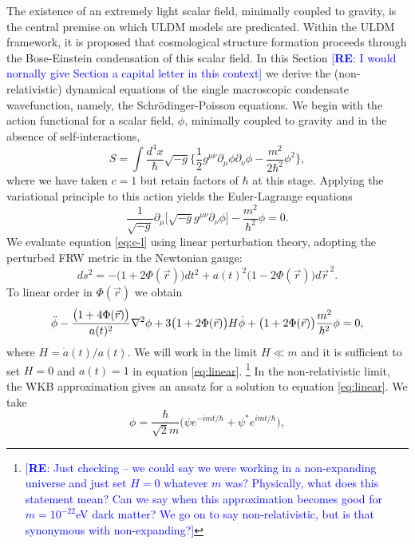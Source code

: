\documentclass[a4paper,11pt]{article}
\newcommand{\re}[1]{\textcolor{blue}{[{\bf RE}: #1]}}
\begin{document}
The existence of an extremely light scalar field, minimally coupled to gravity, is the central premise on which ULDM models are predicated. Within the ULDM framework, it is proposed that cosmological structure formation proceeds through the Bose-Einstein condensation of this scalar field. In this Section  \re{I would nornally give Section a capital letter in this context} we derive the (non-relativistic) dynamical equations of the single macroscopic condensate wavefunction, namely, the Schr{\"o}dinger-Poisson equations. We begin with the action functional for a scalar field, $\phi$, minimally coupled to gravity and in the absence of self-interactions,
%
\begin{equation}\label{eq:action}
    S=\int \frac{d^4x}{\hbar}\sqrt{-g}\bigg\{\frac{1}{2}g^{\mu\nu}\partial_\mu\phi\partial_\nu\phi-\frac{m^2}{2\hbar^2}\phi^2\bigg\},
\end{equation}
%
where we have taken $c=1$ but retain factors of $\hbar$ at this stage. Applying the variational principle to this action yields the Euler-Lagrange equations
%
\begin{equation}\label{eq:e-l}
    \frac{1}{\sqrt{-g}}\partial_\mu\big[\sqrt{-g}g^{\mu\nu}\partial_\nu\phi\big]-\frac{m^2}{\hbar^2}\phi=0.
\end{equation}
We evaluate equation \ref{eq:e-l} using linear perturbation theory, adopting the perturbed FRW metric in the Newtonian gauge:
\begin{equation}\label{eq:pFRW}
    ds^2=-\big(1+2\Phi(\vec{r})\big)dt^2+a(t)^2\big(1-2\Phi(\vec{r})\big)d\vec{r}^{\,2}.
\end{equation}
To linear order in $\Phi(\vec{r})$ we obtain 
\begin{equation}\label{eq:linear}
    \Ddot{\phi}-\frac{\big(1+4\Phi(\vec{r})\big)}{a(t)^2}\nabla^2\phi+3\big(1+2\Phi(\vec{r})\big)H\Dot{\phi}+\big(1+2\Phi(\vec{r})\big)\frac{m^2}{\hbar^2}\phi=0,
\end{equation}
where $H=\Dot{a}(t)/a(t)$. We will work in the limit $H\ll m$ and it is sufficient to set $H=0$ and $a(t)=1$ in equation \ref{eq:linear}. \footnote{ \re{ Just checking -- we could say we were working in a  non-expanding universe and just set $H=0$ whatever $m$ was?  Physically, what does this statement mean? Can we say when this approximation becomes good for $m=10^{-22}$eV dark matter? We go on to say non-relativistic, but is that synonymous with non-expanding?}}  In the non-relativistic limit,  the WKB approximation gives an ansatz for a  solution to equation \ref{eq:linear}.  We take 
\begin{equation}\label{eq:ansatz}
    \phi=\frac{\hbar}{\sqrt{2}m}\big(\psi e^{-imt/\hbar}+\psi^* e^{imt/\hbar}\big),
\end{equation}
\end{document}
